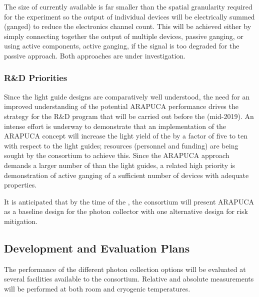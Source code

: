 The size of currently available  is far smaller than the spatial granularity required for the experiment so the output of individual devices will be electrically summed (ganged) to reduce the electronics channel count. This will be achieved either by simply connecting together the output of multiple devices, passive ganging, or using active components, active ganging, if the signal is too degraded for the passive approach. Both approaches are under investigation. 

\subsubsection{R\&D Priorities} 
Since the light guide designs are comparatively well understood, the need for an improved understanding of the potential ARAPUCA performance drives the strategy for the R\&D program that will be carried out before the  (mid-2019). 
An intense effort is underway to demonstrate that an implementation of the ARAPUCA concept will increase the light yield of the  by a factor of five to ten with respect to the light guides; resources (personnel and funding)  are being sought by the consortium to achieve this.  Since the ARAPUCA approach demands a larger number of  than the light guides, a related high priority is demonstration of active ganging of a sufficient number of devices with adequate  properties.

It is anticipated that by the time of the , the consortium will present ARAPUCA as a baseline design for the photon collector with one alternative design for risk mitigation.  


\subsection{Development and Evaluation Plans}

The performance of the different photon collection options will be evaluated at several facilities available to the consortium. 
Relative and absolute measurements will be performed at both room and cryogenic temperatures.

